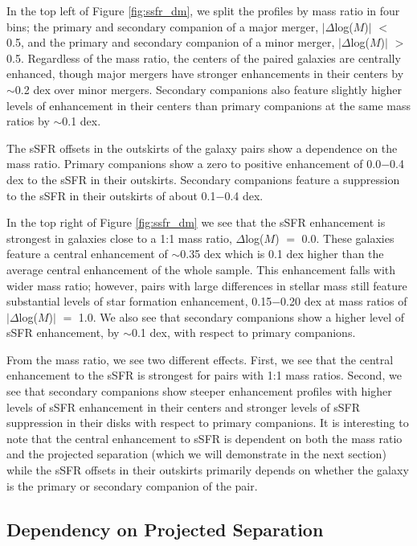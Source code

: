 \documentclass[iop,revtex4,twocolumn,apj,numberedappendix,appendixfloats]{emulateapj}
\begin{document}
In the top left of Figure \ref{fig:ssfr_dm}, we split the profiles by mass ratio in four bins; the primary and secondary companion of a major merger, $|\Delta$log($M$)$|$ $<$ 0.5, and the primary and secondary companion of a minor merger, $|\Delta$log($M$)$|$ $>$ 0.5. Regardless of the mass ratio, the centers of the paired galaxies are centrally enhanced, though major mergers have stronger enhancements in their centers by $\sim$0.2 dex over minor mergers. Secondary companions also feature slightly higher levels of enhancement in their centers than primary companions at the same mass ratios by $\sim$0.1 dex. 

The sSFR offsets in the outskirts of the galaxy pairs show a dependence on the mass ratio. Primary companions show a zero to positive enhancement of 0.0$-$0.4 dex to the sSFR in their outskirts. Secondary companions feature a suppression to the sSFR in their outskirts of about 0.1$-$0.4 dex. 

In the top right of Figure \ref{fig:ssfr_dm} we see that the sSFR enhancement is strongest in galaxies close to a 1:1 mass ratio, $\Delta$log($M$) $=$ 0.0. These galaxies feature a central enhancement of $\sim$0.35 dex which is 0.1 dex higher than the average central enhancement of the whole sample. This enhancement falls with wider mass ratio; however, pairs with large differences in stellar mass still feature substantial levels of star formation enhancement, 0.15$-$0.20 dex at mass ratios of $|\Delta$log($M$)$|$ $=$ 1.0. We also see that secondary companions show a higher level of sSFR enhancement, by $\sim$0.1 dex, with respect to primary companions. 

From the mass ratio, we see two different effects. First, we see that the central enhancement to the sSFR is strongest for pairs with 1:1 mass ratios. Second, we see that secondary companions show steeper enhancement profiles with higher levels of sSFR enhancement in their centers and stronger levels of sSFR suppression in their disks with respect to primary companions. It is interesting to note that the central enhancement to sSFR is dependent on both the mass ratio and the projected separation (which we will demonstrate in the next section) while the sSFR offsets in their outskirts primarily depends on whether the galaxy is the primary or secondary companion of the pair.

\subsection{Dependency on Projected Separation}\label{sec:sep}
\end{document}
